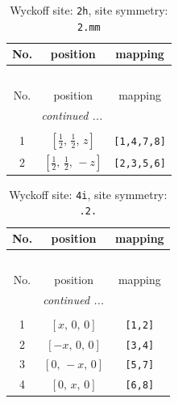 \documentclass[fleqn,8pt]{jsarticle}
\begin{document}
\begin{longtable}{ccc}
\caption{Wyckoff site: {\tt 2h}, site symmetry: {\tt 2.mm}}
 \\
 \hline \hline
No. & position & mapping \\ \hline \endfirsthead

\multicolumn{2}{l}{\tablename\ \thetable{}} \\
 \hline \hline
No. & position & mapping \\ \hline \endhead

 \hline \hline
\multicolumn{2}{r}{\footnotesize\it continued ...} \\ \endfoot

 \hline \hline
\multicolumn{2}{r}{} \\ \endlastfoot

1 & $\left[ \frac{1}{2},\, \frac{1}{2},\, z \right]$ & {\tt [1,4,7,8]} \\ \hline
2 & $\left[ \frac{1}{2},\, \frac{1}{2},\, - z \right]$ & {\tt [2,3,5,6]} \\
\end{longtable}
\renewcommand{\arraystretch}{1.2}
\begin{longtable}{ccc}
\caption{Wyckoff site: {\tt 4i}, site symmetry: {\tt .2.}}
 \\
 \hline \hline
No. & position & mapping \\ \hline \endfirsthead

\multicolumn{2}{l}{\tablename\ \thetable{}} \\
 \hline \hline
No. & position & mapping \\ \hline \endhead

 \hline \hline
\multicolumn{2}{r}{\footnotesize\it continued ...} \\ \endfoot

 \hline \hline
\multicolumn{2}{r}{} \\ \endlastfoot

1 & $\left[ x,\, 0,\, 0 \right]$ & {\tt [1,2]} \\ \hline
2 & $\left[ - x,\, 0,\, 0 \right]$ & {\tt [3,4]} \\ \hline
3 & $\left[ 0,\, - x,\, 0 \right]$ & {\tt [5,7]} \\ \hline
4 & $\left[ 0,\, x,\, 0 \right]$ & {\tt [6,8]} \\
\end{longtable}
\renewcommand{\arraystretch}{1.2}
\end{document}
